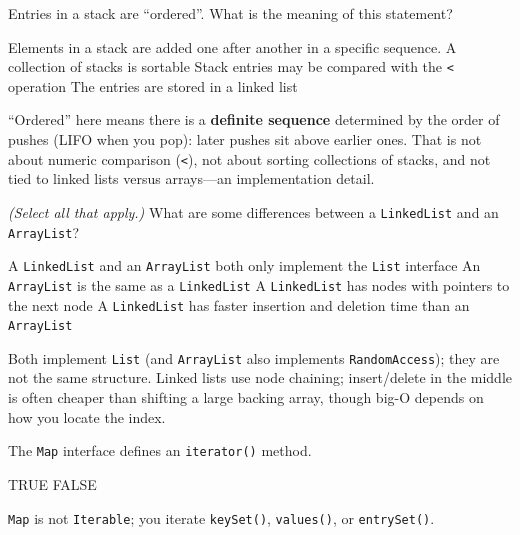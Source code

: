\question[4]
Entries in a stack are ``ordered''. What is the meaning of this statement?
\begin{choices}
  \CorrectChoice Elements in a stack are added one after another in a specific sequence.
  \choice A collection of stacks is sortable
  \choice Stack entries may be compared with the \texttt{<} operation
  \choice The entries are stored in a linked list
\end{choices}
\begin{solution}
  ``Ordered'' here means there is a \textbf{definite sequence} determined by the order of pushes (LIFO when you pop): later pushes sit above earlier ones. That is not about numeric comparison (\texttt{<}), not about sorting collections of stacks, and not tied to linked lists versus arrays---an implementation detail.
\end{solution}

\newpage


\question[4]
\textit{(Select all that apply.)} What are some differences between a \texttt{LinkedList} and an \texttt{ArrayList}?
\begin{checkboxes}
  \choice A \texttt{LinkedList} and an \texttt{ArrayList} both only implement the \texttt{List} interface
  \choice An \texttt{ArrayList} is the same as a \texttt{LinkedList}
  \CorrectChoice A \texttt{LinkedList} has nodes with pointers to the next node
  \CorrectChoice A \texttt{LinkedList} has faster insertion and deletion time than an \texttt{ArrayList}
\end{checkboxes}
\begin{solution}
  Both implement \texttt{List} (and \texttt{ArrayList} also implements \texttt{RandomAccess}); they are not the same structure. Linked lists use node chaining; insert/delete in the middle is often cheaper than shifting a large backing array, though big-O depends on how you locate the index.
\end{solution}

\question[4]
The \texttt{Map} interface defines an \texttt{iterator()} method.
\begin{choices}
  \choice TRUE
  \CorrectChoice FALSE
\end{choices}
\begin{solution}
  \texttt{Map} is not \texttt{Iterable}; you iterate \texttt{keySet()}, \texttt{values()}, or \texttt{entrySet()}.
\end{solution}

